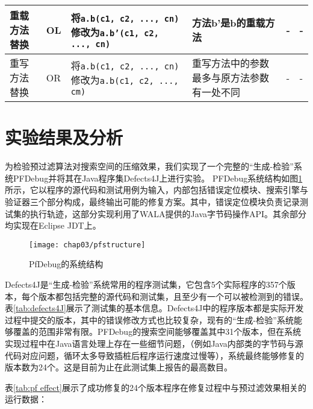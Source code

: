 \begin{landscape}
\begin{table}
\begin{tabular}{|p{3.2cm}|p{0.8cm}|p{6cm}|p{6cm}|p{1cm}|p{4cm}|}
		重载方法替换        & OL	  & 将\texttt{a.b(c1, c2, ..., cn)}修改为\texttt{a.b'(c1, c2, ..., cn)}
		&方法b'是b的重载方法	& - & -							\\ \hline
		
		重写方法替换        & OR	  &	将\texttt{a.b(c1, c2, ..., cn)}修改为\texttt{a.b(c1, c2, ..., cm)}
		& 重写方法中的参数最多与原方法参数有一处不同 & -	& -                           \\ \hline
	\end{tabular}
\end{table}

\end{landscape}



\section{实验结果及分析}%

为检验预过滤算法对搜索空间的压缩效果，我们实现了一个完整的“生成-检验”系统PFDebug并将其在Java程序集Defects4J\cite{Just:2014:DDE:2610384.2628055}上进行实验。
PFDebug系统结构如图\ref{fig:pfstructure}所示，它以程序的源代码和测试用例为输入，内部包括错误定位模块、搜索引擎与验证器三个部分构成，最终输出可能的修复方案。其中，错误定位模块负责记录测试集的执行轨迹，这部分实现利用了WALA\cite{wala}提供的Java字节码操作API。其余部分均实现在Eclipse JDT上。

\begin{figure}
	\centering
	\texttt{[image: chap03/pfstructure]}
	\caption{PfDebug的系统结构}
	\label{fig:pfstructure}
\end{figure}

Defects4J是“生成-检验”系统常用的程序测试集，它包含5个实际程序的357个版本，每个版本都包括完整的源代码和测试集，且至少有一个可以被检测到的错误。表\ref{tab:defects4J}展示了测试集的基本信息。Defects4J中的程序版本都是实际开发过程中提交的版本，其中的错误修改方式也比较复杂，现有的“生成-检验”系统能够覆盖的范围非常有限。PFDebug的搜索空间能够覆盖其中31个版本，但在系统实现过程中在Java语言处理上存在一些细节问题，（例如Java内部类的字节码与源代码对应问题，循环太多导致插桩后程序运行速度过慢等），系统最终能够修复的版本数为24个。这是目前为止在此测试集上报告的最高数目。

表\ref{tab:pf effect}展示了成功修复的24个版本程序在修复过程中与预过滤效果相关的运行数据：

